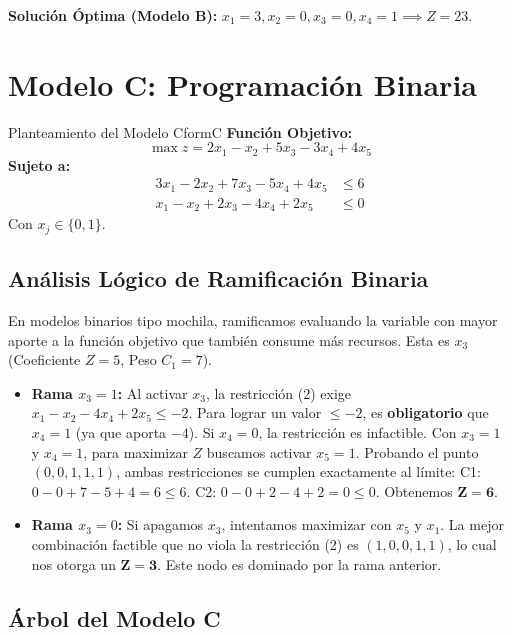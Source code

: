 \documentclass[10pt,a4paper]{article}
\begin{document}
\textbf{Solución Óptima (Modelo B):} $x_1=3, x_2=0, x_3=0, x_4=1 \implies Z=23$.

\newpage

\section{Modelo C: Programación Binaria}

\begin{ejercicio}{Planteamiento del Modelo C}{formC}
\textbf{Función Objetivo:}
\[ \max z = 2x_1 - x_2 + 5x_3 - 3x_4 + 4x_5 \]
\textbf{Sujeto a:}
\begin{align}
    3x_1 - 2x_2 + 7x_3 - 5x_4 + 4x_5 &\leq 6 \\
    x_1 - x_2 + 2x_3 - 4x_4 + 2x_5 &\leq 0 
\end{align}
Con $x_j \in \{0, 1\}$.
\end{ejercicio}

\subsection{Análisis Lógico de Ramificación Binaria}

En modelos binarios tipo mochila, ramificamos evaluando la variable con mayor aporte a la función objetivo que también consume más recursos. Esta es $x_3$ (Coeficiente $Z=5$, Peso $C_1=7$).

\begin{itemize}
    \item \textbf{Rama $x_3 = 1$:} Al activar $x_3$, la restricción (2) exige $x_1 - x_2 - 4x_4 + 2x_5 \leq -2$.
    Para lograr un valor $\leq -2$, es \textbf{obligatorio} que $x_4 = 1$ (ya que aporta $-4$). Si $x_4 = 0$, la restricción es infactible. 
    Con $x_3 = 1$ y $x_4 = 1$, para maximizar $Z$ buscamos activar $x_5 = 1$. Probando el punto $(0, 0, 1, 1, 1)$, ambas restricciones se cumplen exactamente al límite:
    C1: $0 - 0 + 7 - 5 + 4 = 6 \leq 6$.
    C2: $0 - 0 + 2 - 4 + 2 = 0 \leq 0$.
    Obtenemos $\mathbf{Z = 6}$.
    
    \item \textbf{Rama $x_3 = 0$:} Si apagamos $x_3$, intentamos maximizar con $x_5$ y $x_1$. La mejor combinación factible que no viola la restricción (2) es $(1, 0, 0, 1, 1)$, lo cual nos otorga un $\mathbf{Z = 3}$. Este nodo es dominado por la rama anterior.
\end{itemize}

\subsection{Árbol del Modelo C}
\end{document}

